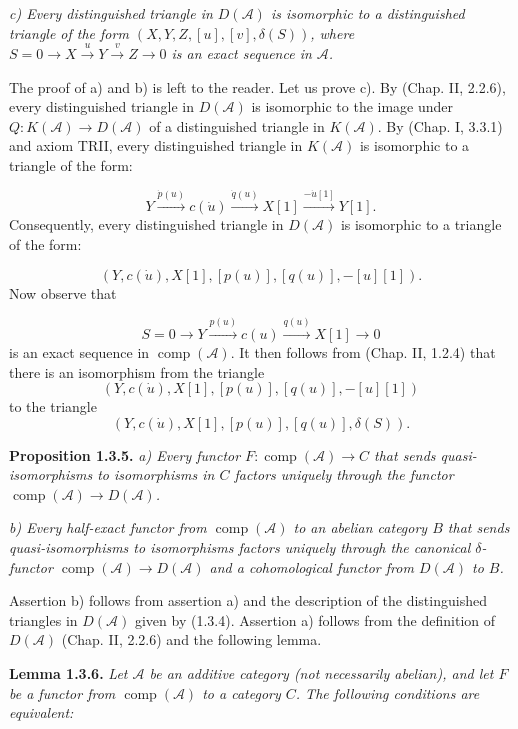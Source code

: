 \clearpage
{}%
\begingroup\small\setlength{\parskip}{0pt}\setlength{\emergencystretch}{1.5em}
\setlength{\abovedisplayskip}{4pt plus 2pt minus 2pt}%
\setlength{\belowdisplayskip}{4pt plus 2pt minus 2pt}%

\noindent\textit{c) Every distinguished triangle in $D(\mathcal A)$ is
isomorphic to a distinguished triangle of the form
$(X,Y,Z,[u],[v],\delta(S))$, where
$S=0\longrightarrow X\xrightarrow{u}Y\xrightarrow{v}Z\longrightarrow0$
is an exact sequence in $\mathcal A$.}

The proof of a) and b) is left to the reader. Let us prove c). By (Chap. II,
2.2.6), every distinguished triangle in $D(\mathcal A)$ is isomorphic to
the image under $Q\colon K(\mathcal A)\longrightarrow D(\mathcal A)$ of a
distinguished triangle in $K(\mathcal A)$. By (Chap. I, 3.3.1) and axiom
TRII, every distinguished triangle in $K(\mathcal A)$ is isomorphic to a
triangle of the form:

\[
Y\xrightarrow{\dot{p}(u)}c(\dot u)
\xrightarrow{\dot{q}(u)}X[1]
\xrightarrow{-\dot u[1]}Y[1].
\]
Consequently, every distinguished triangle in $D(\mathcal A)$ is
isomorphic to a triangle of the form:

\[
(Y,c(\dot u),X[1],[p(u)],[q(u)],-[u][1]).
\]
Now observe that

\[
S=0\longrightarrow Y\xrightarrow{p(u)}c(u)
\xrightarrow{q(u)}X[1]\longrightarrow0
\]
is an exact sequence in $\operatorname{comp}(\mathcal A)$. It then follows
from (Chap. II, 1.2.4) that there is an isomorphism from the triangle
\[
(Y,c(\dot u),X[1],[p(u)],[q(u)],-[u][1])
\]
to the triangle
\[
(Y,c(\dot u),X[1],[p(u)],[q(u)],\delta(S)).
\]

\medskip\noindent\textbf{Proposition 1.3.5.}\quad
\textit{a) Every functor
$F\colon\operatorname{comp}(\mathcal A)\longrightarrow C$ that sends
quasi-isomorphisms to isomorphisms in $C$ factors uniquely through the
functor $\operatorname{comp}(\mathcal A)\longrightarrow D(\mathcal A)$.}

\noindent\textit{b) Every half-exact functor from
$\operatorname{comp}(\mathcal A)$ to an abelian category $B$ that sends
quasi-isomorphisms to isomorphisms factors uniquely through the canonical
$\delta$-functor
$\operatorname{comp}(\mathcal A)\longrightarrow D(\mathcal A)$ and a
cohomological functor from $D(\mathcal A)$ to $B$.}

Assertion b) follows from assertion a) and the description of the
distinguished triangles in $D(\mathcal A)$ given by (1.3.4). Assertion a)
follows from the definition of $D(\mathcal A)$ (Chap. II, 2.2.6) and the
following lemma.

\medskip\noindent\textbf{Lemma 1.3.6.}\quad
\textit{Let $\mathcal A$ be an additive category (not necessarily
abelian), and let $F$ be a functor from $\operatorname{comp}(\mathcal A)$
to a category $C$. The following conditions are equivalent:}
\endgroup

